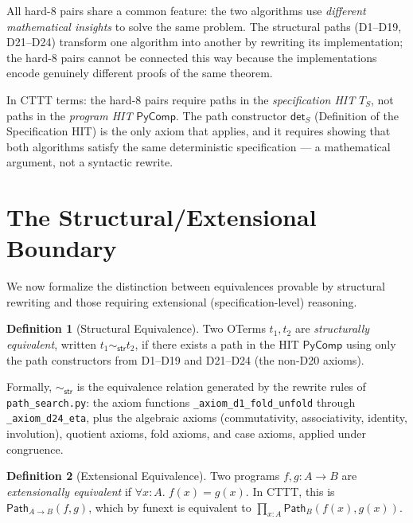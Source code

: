 \documentclass[11pt,a4paper]{report}
\theoremstyle{definition}
\newtheorem{definition}{Definition}[chapter]
\theoremstyle{plain}
\newcommand{\Path}{\mathsf{Path}}
\begin{document}
All hard-8 pairs share a common feature: the two algorithms use
\emph{different mathematical insights} to solve the same problem.
The structural paths (D1--D19, D21--D24) transform one algorithm
into another by rewriting its implementation; the hard-8 pairs
cannot be connected this way because the implementations encode
genuinely different proofs of the same theorem.

In CTTT terms: the hard-8 pairs require paths in the
\emph{specification HIT} $T_S$, not paths in the \emph{program HIT}
$\mathsf{PyComp}$.  The path constructor $\mathsf{det}_S$
(Definition of the Specification HIT) is the only axiom that
applies, and it requires showing that both algorithms satisfy the
same deterministic specification --- a mathematical argument, not a
syntactic rewrite.


\section{The Structural/Extensional Boundary}
\label{sec:boundary}

We now formalize the distinction between equivalences provable by
structural rewriting and those requiring extensional (specification-level)
reasoning.

\begin{definition}[Structural Equivalence]
\label{def:structural-equiv}
Two OTerms $t_1, t_2$ are \emph{structurally equivalent}, written
$t_1 \sim_{\mathsf{str}} t_2$, if there exists a path in the HIT
$\mathsf{PyComp}$ using only the path constructors from D1--D19
and D21--D24 (the non-D20 axioms).

Formally, $\sim_{\mathsf{str}}$ is the equivalence relation generated
by the rewrite rules of \texttt{path\_search.py}: the axiom functions
\texttt{\_axiom\_d1\_fold\_unfold} through
\texttt{\_axiom\_d24\_eta}, plus the algebraic axioms
(commutativity, associativity, identity, involution), quotient axioms,
fold axioms, and case axioms, applied under congruence.
\end{definition}

\begin{definition}[Extensional Equivalence]
\label{def:ext-equiv}
Two programs $f, g : A \to B$ are \emph{extensionally equivalent}
if $\forall x : A.\; f(x) = g(x)$.  In CTTT, this is
$\Path_{A \to B}(f, g)$, which by funext is equivalent to
$\prod_{x:A} \Path_B(f(x), g(x))$.
\end{definition}
\end{document}
